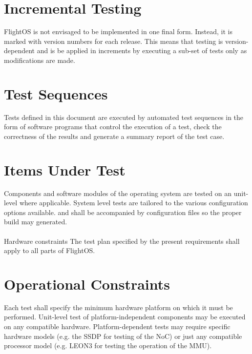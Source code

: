 \section{Incremental Testing}

FlightOS is not envisaged to be implemented in one final form. Instead, it is
marked with version numbers for each release. This means that testing is
version-dependent and is be applied in increments by executing a sub-set of
tests only as modifications are made.


\section{Test Sequences}

Tests defined in this document are executed by automated test sequences in the
form of software programs that control the execution of a test, check the
correctness of the results and generate a summary report of the test case.



\section{Items Under Test}

Components and software modules of the operating system are tested on an
unit-level where applicable. System level tests are tailored to the
various configuration options available. and shall be accompanied by
configuration files so the proper build may generated.\\
\\

 {Hardware constraints}{%
The test plan specified by the present requirements shall apply to all parts %
of FlightOS.
}{}



\section{Operational Constraints}

Each test shall specify the minimum hardware platform on which it must be
performed. Unit-level test of platform-independent components may be executed
on any compatible hardware. Platform-dependent tests may require specific
hardware models (e.g. the \gls{SSDP} for testing of the \gls{NoC}) or just any
compatible processor model (e.g. \gls{LEON3} for testing the operation of the
\gls{MMU}).\\
\\

